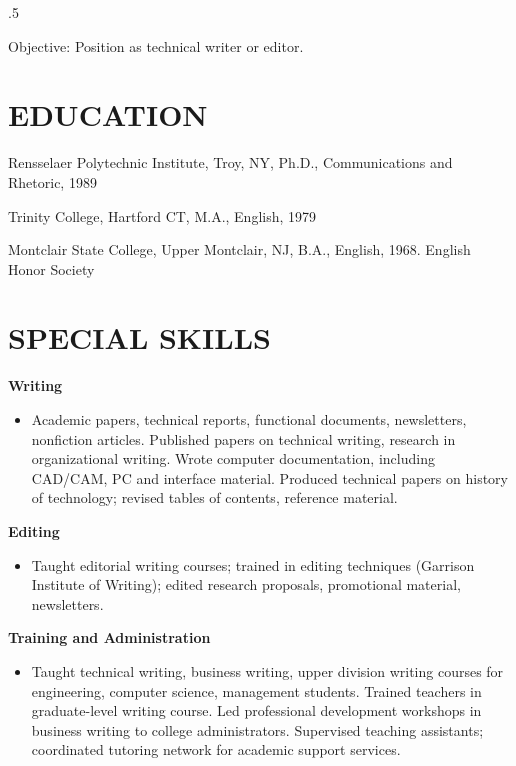\begin{resume}
\vspace{0.1in}
\moveleft.5\sectionwidth\centerline{Objective: Position as technical writer or editor.}  

\section{EDUCATION}
\vspace{0.1in} 
 
    Rensselaer Polytechnic Institute, Troy, NY, Ph.D., 
    Communications and Rhetoric, 1989 
 
    Trinity College, Hartford CT, M.A., English, 1979 
 
    Montclair State College, Upper Montclair, NJ, B.A., English, 
    1968. English Honor Society 
 
 
\section{SPECIAL SKILLS} 
\vspace{0.1in}
  {\bf Writing}
    \begin{itemize} %
      \item[] Academic papers, technical reports, functional documents, 
        newsletters, nonfiction articles. Published papers on 
        technical writing, research in organizational writing. 
        Wrote computer documentation, including CAD/CAM, PC and 
        interface material. Produced technical papers on history 
        of technology; revised tables of contents, reference 
        material. 
      \end{itemize}
{\bf Editing} 
       \begin{itemize}
        \item[] Taught editorial writing courses; trained in editing 
        techniques (Garrison Institute of Writing); edited 
        research proposals, promotional material, newsletters.
    \end{itemize}

  {\bf Training and Administration} 
        \begin{itemize}
        \item[] Taught technical writing, business writing, upper 
        division writing courses for engineering, computer 
        science, management students. Trained teachers in 
        graduate-level writing course. Led professional 
        development workshops in business writing to college 
        administrators. Supervised teaching assistants; 
        coordinated tutoring network for academic support 
        services. 
       \end{itemize}


\end{resume}
